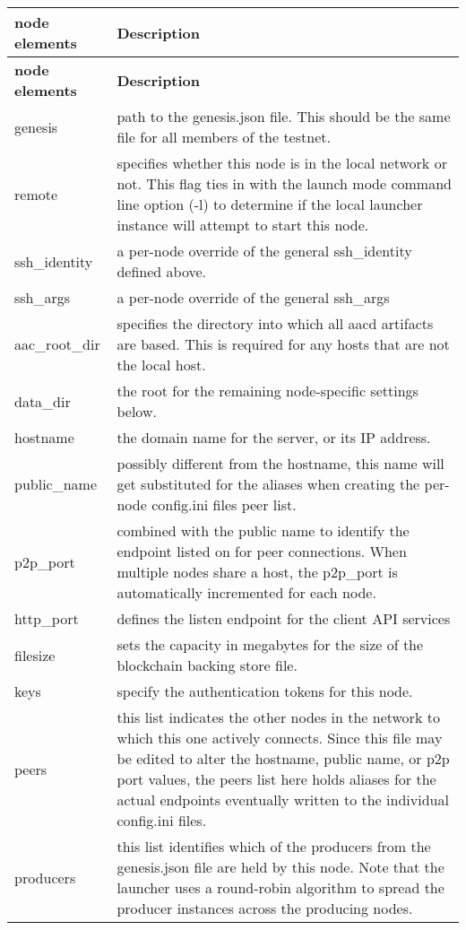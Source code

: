 \tabulinesep=1mm
\begin{longtabu} spread 0pt [c]{*{2}{|X[-1]}|}
\hline
\rowcolor{\tableheadbgcolor}\textbf{ node elements  }&\textbf{ Description   }\\
\endfirsthead
\hline
\endfoot
\hline
\rowcolor{\tableheadbgcolor}\textbf{ node elements  }&\textbf{ Description   }\\
\endhead
genesis  &path to the genesis.\+json file. This should be the same file for all members of the testnet.   \\
remote  &specifies whether this node is in the local network or not. This flag ties in with the launch mode command line option (-\/l) to determine if the local launcher instance will attempt to start this node.   \\
ssh\+\_\+identity  &a per-\/node override of the general ssh\+\_\+identity defined above.   \\
ssh\+\_\+args  &a per-\/node override of the general ssh\+\_\+args   \\
aac\+\_\+root\+\_\+dir  &specifies the directory into which all aacd artifacts are based. This is required for any hosts that are not the local host.   \\
data\+\_\+dir  &the root for the remaining node-\/specific settings below.   \\
hostname  &the domain name for the server, or its IP address.   \\
public\+\_\+name  &possibly different from the hostname, this name will get substituted for the aliases when creating the per-\/node config.\+ini file\textquotesingle{}s peer list.   \\
p2p\+\_\+port  &combined with the public name to identify the endpoint listed on for peer connections. When multiple nodes share a host, the p2p\+\_\+port is automatically incremented for each node.   \\
http\+\_\+port  &defines the listen endpoint for the client A\+PI services   \\
filesize  &sets the capacity in megabytes for the size of the blockchain backing store file.   \\
keys  &specify the authentication tokens for this node.   \\
peers  &this list indicates the other nodes in the network to which this one actively connects. Since this file may be edited to alter the hostname, public name, or p2p port values, the peers list here holds aliases for the actual endpoints eventually written to the individual config.\+ini files.   \\
producers  &this list identifies which of the producers from the genesis.\+json file are held by this node. Note that the launcher uses a round-\/robin algorithm to spread the producer instances across the producing nodes.   \\
\end{longtabu}


